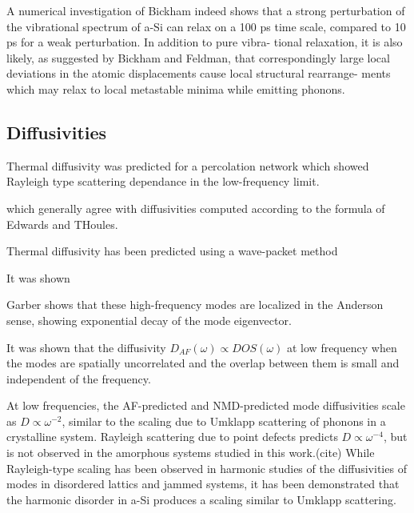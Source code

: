 \documentclass[aps,prb,twocolumn,superscriptaddress,footinbib,amsmath,amssymb,floatfix]{revtex4}
\begin{document}
A numerical investigation of Bickham\cite{bickham_numerical_1999} 
indeed shows that a strong perturbation of the vibrational
spectrum of a-Si can relax on a 100 ps time scale, compared
to 10 ps for a weak perturbation. In addition to pure vibra-
tional relaxation, it is also likely, as suggested by Bickham
and Feldman,\cite{bickham_calculation_1998} 
that correspondingly large local deviations in
the atomic displacements cause local structural rearrange-
ments which may relax to local metastable minima while
emitting phonons.

\subsection{\label{S:Diffusivities}Diffusivities}


Thermal diffusivity was predicted for a percolation network which showed 
Rayleigh type scattering dependance in the low-frequency limit.
\cite{sheng_heat_1991}

which generally agree with diffusivities computed according to the 
formula of Edwards and THoules.\cite{edwards_numerical_1972,
feldman_numerical_1999,beltukov_ioffe-regel_2013}

Thermal diffusivity has been predicted using a wave-packet method

It was shown 

Garber shows that these high-frequency modes are localized in the 
Anderson sense, showing exponential decay of the mode eigenvector.
\cite{garber_numerical_2001}

It was shown that the diffusivity $D_{AF}(\omega) \propto DOS(\omega)$ 
at low frequency when the modes are spatially uncorrelated and the 
overlap between them is small and independent of the frequency.
\cite{vitelli_heat_2010,xu_energy_2009}

At low frequencies, the AF-predicted and NMD-predicted mode 
diffusivities scale as $D \propto \omega^{-2}$, similar to the scaling 
due to Umklapp scattering of phonons in a crystalline system. Rayleigh 
scattering due to point defects predicts $D \propto \omega^{-4}$, 
but is not observed in the amorphous systems studied in this work.(cite) 
While Rayleigh-type scaling has been 
observed in harmonic studies of the diffusivities of modes in 
disordered lattics and jammed systems,
\cite{sheng_heat_1991,xu_energy_2009,vitelli_heat_2010} 
it has been demonstrated that the harmonic disorder in a-Si 
produces a scaling similar to Umklapp scattering.
\cite{feldman_thermal_1993}
\end{document}
